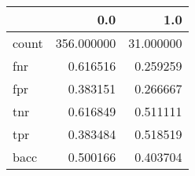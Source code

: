 \begin{tabular}{lrr}
\toprule
{} &         0.0 &        1.0 \\
\midrule
count &  356.000000 &  31.000000 \\
fnr   &    0.616516 &   0.259259 \\
fpr   &    0.383151 &   0.266667 \\
tnr   &    0.616849 &   0.511111 \\
tpr   &    0.383484 &   0.518519 \\
bacc  &    0.500166 &   0.403704 \\
\bottomrule
\end{tabular}
